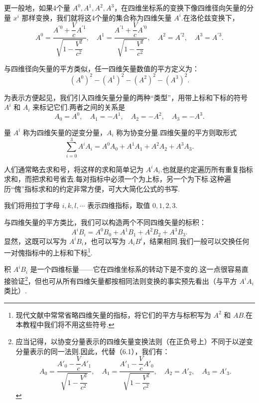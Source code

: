 更一般地，如果4个量 $A^0,A^1,A^2,A^3$，在四维坐标系的变换下像四维径向矢量的分量 $x^i$ 那样变换，我们就将这4个量的集合称为四维矢量 $A^i$.在洛伦兹变换下，
\begin{equation}
  A^0=\frac{A^{\prime 0}+\dfrac{V}{c}A^{\prime 1}}{\sqrt{1-\dfrac{V^2}{c^2}}},\quad
  A^1=\frac{A^{\prime 1}+\dfrac{V}{c}A^{\prime 0}}{\sqrt{1-\dfrac{V^2}{c^2}}},\quad
  A^2=A^{\prime 2},\quad A^3=A^{\prime 3}.
\end{equation}

与四维径向矢量的平方类似，任一四维矢量数值的平方定义为：
\begin{equation*}
  (A^0)^2-(A^1)^2-(A^2)^2-(A^3)^2.
\end{equation*}

为表示方便起见，我们引入四维矢量分量的两种“类型”，用带上标和下标的符号 $A^i$ 和 $A_i$ 来标记它们.两者之间的关系是
\begin{equation}
  A_0=A^0,\quad A_1=-A^1,\quad A_2=-A^2,\quad A_3=-A^3.
\end{equation}

量 $A^i$ 称为四维矢量的逆变分量，$A_i$ 称为协变分量.四维矢量的平方则取形式
\begin{equation*}
  \sum_{i=0}^{3}A^iA_i=A^0A_0+A^1A_1+A^2A_2+A^3A_3.
\end{equation*}

人们通常略去求和号，将这样的求和简单记为 $A^iA_i$.也就是约定遍历所有重复指标求和，而把求和号省去.每对指标中必须一个为上标，另一个为下标.这种遍历“傀”指标求和的约定非常方便，可大大简化公式的书写.

我们将用拉丁字母 $i,k,l,\cdots$ 表示四维指标，取值 $0,1,2,3$.

与四维矢量的平方类比，我们可以构造两个不同四维矢量的标积：
\begin{equation*}
  A^iB_i=A^0B_0+A^1B_1+A^2B_2+A^3B_3.
\end{equation*}
显然，这既可以写为 $A^iB_i$，也可以写为 $A_iB^i$，结果相同.我们一般可以交换任何一对傀指标中的上标和下标\footnote{现代文献中常常省略四维矢量的指标，将它们的平方与标积写为 $A^2$ 和 $AB$.在本教程中我们将不用这些符号.}.

积 $A^iB_i$ 是一个四维标量——它在四维坐标系的转动下是不变的.这一点很容易直接验证\footnote{应当记得，以协变分量表示的四维矢量变换法则（在正负号上）不同于以逆变分量表示的同一法则.因此，代替（6.1），我们有：
\begin{equation*}
  A_0=\frac{A'_0-\dfrac{V}{c}A'_1}{\sqrt{1-\dfrac{V^2}{c^2}}},\quad
  A_1=\frac{A'_1-\dfrac{V}{c}A'_0}{\sqrt{1-\dfrac{V^2}{c^2}}},\quad
  A_2=A'_2,\quad A_3=A'_3.
\end{equation*}}，但也可从所有四维矢量都按相同法则变换的事实预先看出（与平方 $A^iA_i$ 类比）.

